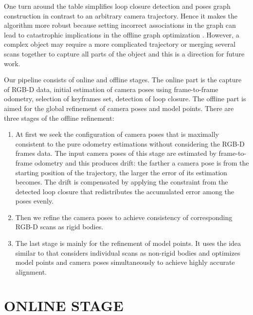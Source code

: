 \documentclass[letterpaper, 10 pt, conference]{ieeeconf}  %
\begin{document}

One turn around the table simplifies loop closure detection and poses graph construction
in contrast to an arbitrary camera trajectory.
Hence it makes the algorithm more robust because setting incorrect associations
in the graph can lead to catastrophic implications in the offline graph
optimization \cite{sunderhauf2012switchable}.
However, a complex object may require a more complicated trajectory
or merging several scans together to capture all parts of the object %
and this is a direction for future work.

Our pipeline consists of online and offline stages. The online part is the capture of RGB-D data,
initial estimation of camera poses using frame-to-frame odometry,
selection of keyframes set, detection of loop closure. The offline part is aimed for
the global refinement of camera poses and model points. There are three stages
of the offline refinement:

\begin{enumerate}
\item At first we seek the configuration of camera poses that is
maximally consistent to the pure odometry estimations without 
considering the RGB-D frames data. The input camera poses of this stage
are estimated by frame-to-frame odometry and this produces drift: 
the farther a camera pose is from the starting position of the trajectory, 
the larger the error of its estimation becomes. The drift is compensated
by applying the constraint from the detected loop closure 
that redistributes the accumulated error among the poses evenly.

\item Then we refine the camera poses to achieve 
consistency of corresponding RGB-D scans as rigid bodies.

\item The last stage is mainly for the refinement of model points. It uses the idea similar to \cite{ruhnke2012highly}
that considers individual scans as non-rigid bodies and optimizes
model points and camera poses simultaneously to achieve highly accurate alignment.

\end{enumerate}

\section{ONLINE STAGE}
\end{document}
